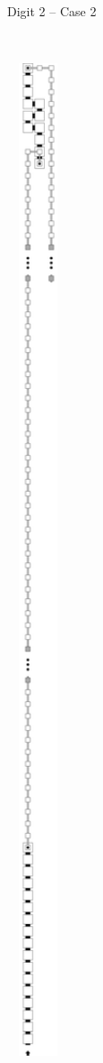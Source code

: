 \begin{figure}[H]
\begin{subfigure}[t]{0.2\textwidth}
            \caption{\label{fig:digit_top_case2_digit2_msr} Digit 2 -- Case 2}
        \end{subfigure}%
        ~
        \begin{subfigure}[t]{0.2\textwidth}
            \centering
            \includegraphics[width=0.2\textwidth]{digit_top_case1_digit1_msr}

\end{subfigure}
\end{figure}
